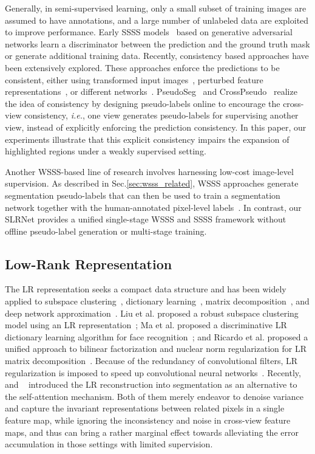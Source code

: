 \documentclass[twocolumn]{svjour3}          \smartqed  \usepackage{graphicx}
\makeatletter
\newcommand{\Sec}{Sec.\@\xspace}
\newcommand{\prelim}[1]{{#1}}
\makeatother
\begin{document}
Generally, in semi-supervised learning, only a small subset of training images are assumed to have annotations, and a large number of unlabeled data are exploited to improve performance.
Early SSSS models~\citep{HungTLL018:AdvSemSeg,SoulySS17:GANSeg} based on generative adversarial networks learn a discriminator between the prediction and the ground truth mask  or generate additional training data.
Recently, consistency based approaches have been extensively explored. These approaches enforce the predictions to be consistent, either using transformed input images~\citep{FrenchLAMF20:SSSSNeedsPerturbations,zou2020:pseudoseg}, perturbed feature representations~\citep{OualiHT20:CCT}, or different networks~\citep{Chen2021:CrossPseudo}.
PseudoSeg~\citep{zou2020:pseudoseg} and CrossPseudo~\citep{Chen2021:CrossPseudo} realize the idea of consistency by designing pseudo-labels online to encourage the cross-view consistency, \textit{i.e.}, one view generates pseudo-labels for supervising another view, instead of explicitly enforcing the prediction consistency.
In this paper, our experiments illustrate that this explicit consistency impairs the expansion of highlighted regions under a weakly supervised setting.

Another WSSS-based line of research involves harnessing low-cost image-level supervision. As described in \Sec\ref{sec:wsss_related}, WSSS approaches generate segmentation pseudo-labels that can then be used to train a segmentation network together with the human-annotated pixel-level labels~\citep{LeeKLLY19:FickleNet,WeiXSJFH18:mdc,LiWPE018:GAIN}.
In contrast, our SLRNet provides a unified single-stage WSSS and SSSS framework without offline pseudo-label generation or multi-stage training.

\subsection{Low-Rank Representation}
The LR representation seeks a compact data structure and has been widely applied to subspace clustering~\citep{liu2012robust}, dictionary learning~\citep{ma2012sparse},
matrix decomposition~\citep{cabral2013unifying},
and deep network approximation~\citep{tai2016convolutional}.
Liu et al. proposed a robust subspace clustering model using an LR representation~\citep{liu2012robust};
Ma et al. proposed a discriminative LR dictionary learning algorithm for face recognition~\citep{ma2012sparse}; and Ricardo et al. proposed a unified approach to bilinear factorization and nuclear norm regularization for LR matrix decomposition~\citep{cabral2013unifying}.
Because of the redundancy of convolutional filters, LR regularization is imposed to speed up
convolutional neural networks~\citep{tai2016convolutional}.
\prelim{
Recently, \cite{Zheng:ham} and ~\cite{Lixia19:EMANET} introduced the LR reconstruction into segmentation as an alternative to the self-attention mechanism.
Both of them merely endeavor to denoise variance and capture the invariant representations between related pixels in a single feature map, while ignoring the inconsistency and noise in cross-view feature maps, and thus can bring a rather marginal effect towards alleviating the error accumulation in those settings with limited supervision.
}
\end{document}

